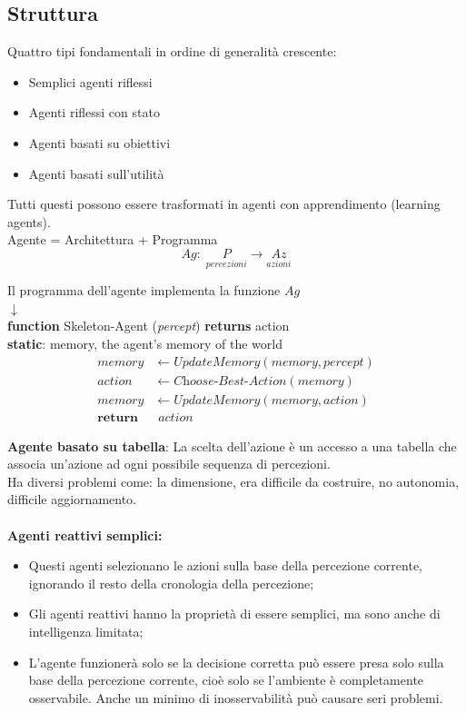 \documentclass[../main.tex]{subfiles}
\begin{document}
	\subsection{Struttura}
	Quattro tipi fondamentali in ordine di generalità crescente:
	\begin{itemize}
		\item Semplici agenti riflessi
		\item Agenti riflessi con stato
		\item Agenti basati su obiettivi
		\item Agenti basati sull'utilità
	\end{itemize}
	Tutti questi possono essere trasformati in agenti con apprendimento (learning agents).\\
	Agente = Architettura + Programma
	\[Ag: \; \underset{percezioni}{P} \rightarrow \underset{azioni}{Az}\]
	\begin{center}
		Il programma dell'agente implementa la funzione $Ag$\\
		$\downarrow$\\
		\textbf{function} Skeleton-Agent (\textit{percept}) \textbf{returns} action\\
		\textbf{static}: memory, the agent’s memory of the world
		\begin{align*}
			\textit{memory} &\leftarrow \textit{UpdateMemory}(\textit{memory}, \textit{percept}) \\
			\textit{action} &\leftarrow \textit{Choose-Best-Action}(\textit{memory}) \\
			\textit{memory} &\leftarrow \textit{UpdateMemory}(\textit{memory}, \textit{action})\\
			\textbf{return} & \textit{ action}
		\end{align*}
	\end{center}
	\textbf{Agente basato su tabella}: La scelta dell’azione è un accesso a una tabella che associa un’azione ad ogni possibile sequenza di percezioni.\\
	Ha diversi problemi come: la dimensione, era difficile da costruire, no autonomia, difficile aggiornamento.\\ \\
	\textbf{Agenti reattivi semplici:}
	\begin{itemize}
		\item Questi agenti selezionano le azioni sulla base della percezione corrente, ignorando il resto della cronologia della percezione;
		\item Gli agenti reattivi hanno la proprietà di essere semplici, ma sono anche di intelligenza limitata;
		\item L’agente funzionerà solo se la decisione corretta può essere presa solo sulla base della percezione corrente, cioè solo se l’ambiente è completamente osservabile. Anche un minimo di inosservabilità può causare seri problemi.
	\end{itemize}
\end{document}
